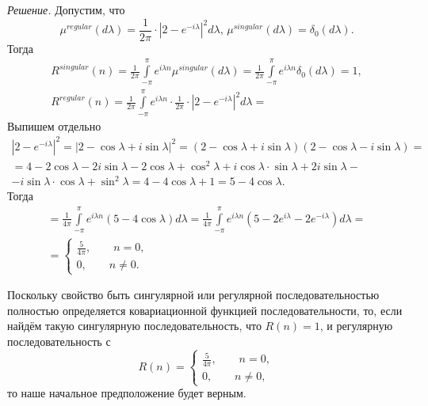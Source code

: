\textit{Решение.}
Допустим, что
\begin{equation*}
  \mu^{regular} \left( d \lambda \right) =
  \frac{1}{2 \pi } \cdot \left| 2 - e^{-i \lambda } \right|^2 d \lambda, \,
  \mu^{singular} \left( d \lambda \right) = \delta_0 \left( d \lambda \right).
\end{equation*}
Тогда
\begin{gather*}
  R^{singular} \left( n \right) =
  \frac{1}{2 \pi }
  \int \limits_{-\pi }^{ \pi } e^{i \lambda n} \mu^{singular} \left( d \lambda \right) =
  \frac{1}{2 \pi } \int \limits_{-\pi }^{ \pi } e^{i \lambda n} \delta_0 \left( d \lambda \right) =
  1, \\
  R^{regular} \left( n \right) =
  \frac{1}{2 \pi } \int \limits_{-\pi }^{ \pi }
    e^{i \lambda n} \cdot \frac{1}{2 \pi } \cdot \left| 2 - e^{-i \lambda } \right|^2
  d \lambda =
\end{gather*}
Выпишем отдельно
\begin{gather*}
  \left| 2 - e^{-i \lambda } \right|^2 =
  \left| 2 - \cos \lambda + i \sin \lambda \right|^2 =
  \left(
    2 - \cos \lambda + i \sin \lambda \right) \left( 2 - \cos \lambda - i \sin \lambda
  \right) = \\
  = 4 - 2 \cos \lambda - 2i \sin \lambda - 2 \cos \lambda + \cos^2 \lambda +
  i \cos \lambda \cdot \sin \lambda + 2i \sin \lambda - \\
  - i \sin \lambda \cdot \cos \lambda + \sin^2 \lambda =
  4 - 4 \cos \lambda + 1 =
  5 - 4 \cos \lambda.
\end{gather*}
Тогда
\begin{gather*}
  = \frac{1}{4 \pi }
  \int \limits_{-\pi }^{ \pi } e^{i \lambda n} \left( 5 - 4 \cos \lambda \right) d \lambda =
  \frac{1}{4 \pi } \int \limits_{-\pi }^{ \pi }
    e^{i \lambda n} \left( 5 - 2e^{i \lambda } - 2e^{-i \lambda } \right)
  d \lambda = \\
  = \begin{cases}
    \frac{5}{4 \pi }, \qquad n = 0, \\
    0, \qquad n \neq 0.
  \end{cases}
\end{gather*}

Поскольку свойство быть сингулярной или регулярной последовательностью полностью определяется
ковариационной функцией последовательности, то, если найдём такую сингулярную последовательность,
что $R \left( n \right) = 1$, и регулярную последовательность с
\begin{equation*}
  R \left( n \right) =
  \begin{cases}
    \frac{5}{4 \pi }, \qquad n = 0, \\
    0, \qquad n \neq 0,
  \end{cases}
\end{equation*}
то наше начальное предположение будет верным.

